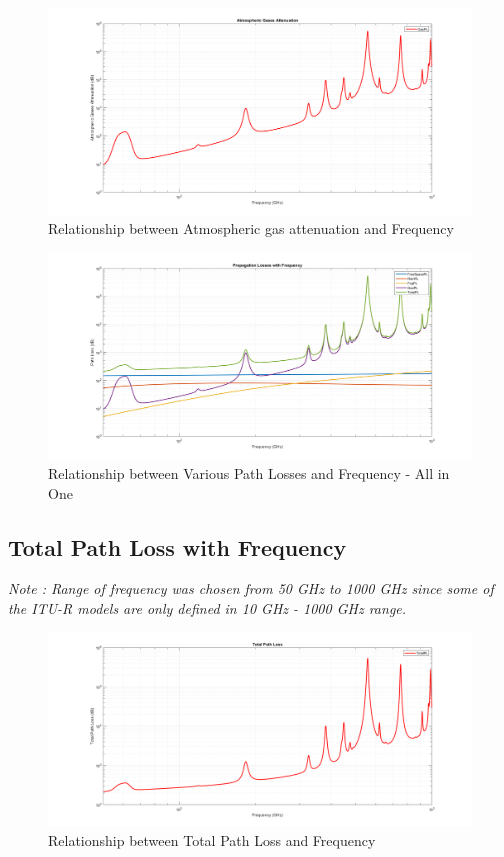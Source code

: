\documentclass[a4paper,11pt]{article}%
\begin{document}
\begin{figure}[!h]
	\centering
	\includegraphics[scale=0.35]{figures/GasPL.png}
	\caption{Relationship between Atmospheric gas attenuation and Frequency}
\end{figure}

\begin{figure}[!h]
	\centering
	\includegraphics[scale=0.35]{figures/AllinOne.png}
	\caption{Relationship between Various Path Losses and Frequency - All in One}
\end{figure}
\subsection{Total Path Loss with Frequency}
\textit{Note : Range of frequency was chosen from 50 GHz to 1000 GHz since some of the ITU-R models are only defined in 10 GHz - 1000 GHz range.}
\begin{figure}[!h]
	\centering
	\includegraphics[scale=0.35]{figures/TotalPL.png}
	\caption{Relationship between Total Path Loss and Frequency}
\end{figure}
\end{document}
